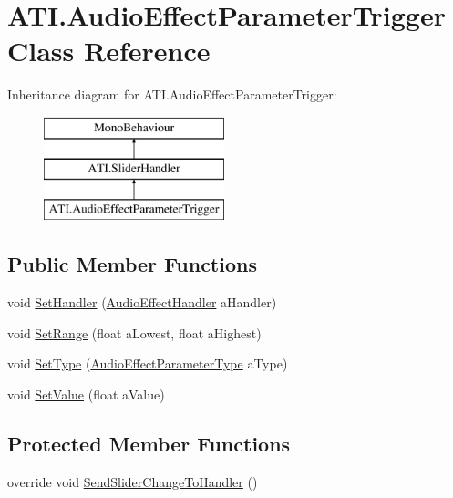 \hypertarget{class_a_t_i_1_1_audio_effect_parameter_trigger}{}\section{A\+T\+I.\+Audio\+Effect\+Parameter\+Trigger Class Reference}
\label{class_a_t_i_1_1_audio_effect_parameter_trigger}
Inheritance diagram for A\+T\+I.\+Audio\+Effect\+Parameter\+Trigger\+:\begin{figure}[H]
\begin{center}
\leavevmode
\includegraphics[height=3.000000cm]{class_a_t_i_1_1_audio_effect_parameter_trigger}
\end{center}
\end{figure}
\subsection*{Public Member Functions}
\begin{DoxyCompactItemize}
\item 
void \hyperlink{class_a_t_i_1_1_audio_effect_parameter_trigger_a69dc7845ba6454981ce5454ca55b4cb1}{Set\+Handler} (\hyperlink{class_a_t_i_1_1_audio_effect_handler}{Audio\+Effect\+Handler} a\+Handler)
\item 
void \hyperlink{class_a_t_i_1_1_audio_effect_parameter_trigger_a3b61498abf2b3e3c8cba23e296ff9273}{Set\+Range} (float a\+Lowest, float a\+Highest)
\item 
void \hyperlink{class_a_t_i_1_1_audio_effect_parameter_trigger_a12b9e1d13260a5970f5effed71b9a216}{Set\+Type} (\hyperlink{class_a_t_i_a1123d61b8dceb5867a3683e8d2224ee1}{Audio\+Effect\+Parameter\+Type} a\+Type)
\item 
void \hyperlink{class_a_t_i_1_1_audio_effect_parameter_trigger_a07ec3a40faeed18c0d85abb035270292}{Set\+Value} (float a\+Value)
\end{DoxyCompactItemize}
\subsection*{Protected Member Functions}
\begin{DoxyCompactItemize}
\item 
override void \hyperlink{class_a_t_i_1_1_audio_effect_parameter_trigger_ad1dde7a7b8ca7db2766b4941ef826e76}{Send\+Slider\+Change\+To\+Handler} ()
\end{DoxyCompactItemize}
